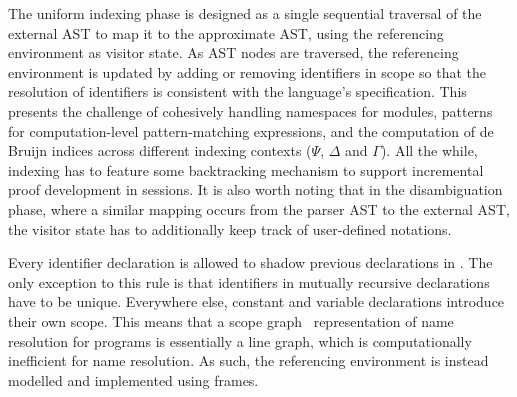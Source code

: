 The uniform indexing phase is designed as a single sequential traversal of the external \ac{AST} to map it to the approximate \ac{AST}, using the referencing environment as visitor state.
As \ac{AST} nodes are traversed, the referencing environment is updated by adding or removing identifiers in scope so that the resolution of identifiers is consistent with the language's specification.
This presents the challenge of cohesively handling namespaces for modules, patterns for computation-level pattern-matching expressions, and the computation of de Bruijn indices across different indexing contexts ($\Psi$, $\Delta$ and $\Gamma$).
All the while, indexing has to feature some backtracking mechanism to support incremental proof development in \Harpoon sessions.
It is also worth noting that in the disambiguation phase, where a similar mapping occurs from the parser \ac{AST} to the external \ac{AST}, the visitor state has to additionally keep track of user-defined notations.


Every identifier declaration is allowed to shadow previous declarations in \Beluga.
The only exception to this rule is that identifiers in mutually recursive declarations have to be unique.
Everywhere else, constant and variable declarations introduce their own scope.
This means that a scope graph~\cite{nameresolution} representation of name resolution for \Beluga programs is essentially a line graph, which is computationally inefficient for name resolution.
As such, the referencing environment is instead modelled and implemented using frames.


